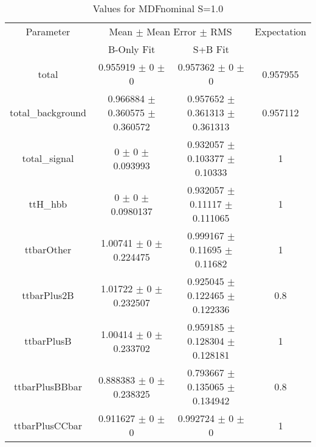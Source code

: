 \begin{table}
\centering
\caption{Values for MDFnominal S=1.0}
\begin{tabular}{cccc}
\toprule
Parameter & \multicolumn{2}{c}{Mean $\pm$ Mean Error $\pm$ RMS} & Expectation\\
 & B-Only Fit & S+B Fit & \\
\midrule
total & \num{0.955919} $\pm$ \num{0} $\pm$ \num{0} & \num{0.957362} $\pm$ \num{0} $\pm$ \num{0} & \num{0.957955}\\
total\_background & \num{0.966884} $\pm$ \num{0.360575} $\pm$ \num{0.360572} & \num{0.957652} $\pm$ \num{0.361313} $\pm$ \num{0.361313} & \num{0.957112}\\
total\_signal & \num{0} $\pm$ \num{0} $\pm$ \num{0.093993} & \num{0.932057} $\pm$ \num{0.103377} $\pm$ \num{0.10333} & \num{1}\\
ttH\_hbb & \num{0} $\pm$ \num{0} $\pm$ \num{0.0980137} & \num{0.932057} $\pm$ \num{0.11117} $\pm$ \num{0.111065} & \num{1}\\
ttbarOther & \num{1.00741} $\pm$ \num{0} $\pm$ \num{0.224475} & \num{0.999167} $\pm$ \num{0.11695} $\pm$ \num{0.11682} & \num{1}\\
ttbarPlus2B & \num{1.01722} $\pm$ \num{0} $\pm$ \num{0.232507} & \num{0.925045} $\pm$ \num{0.122465} $\pm$ \num{0.122336} & \num{0.8}\\
ttbarPlusB & \num{1.00414} $\pm$ \num{0} $\pm$ \num{0.233702} & \num{0.959185} $\pm$ \num{0.128304} $\pm$ \num{0.128181} & \num{1}\\
ttbarPlusBBbar & \num{0.888383} $\pm$ \num{0} $\pm$ \num{0.238325} & \num{0.793667} $\pm$ \num{0.135065} $\pm$ \num{0.134942} & \num{0.8}\\
ttbarPlusCCbar & \num{0.911627} $\pm$ \num{0} $\pm$ \num{0} & \num{0.992724} $\pm$ \num{0} $\pm$ \num{0} & \num{1}\\
\bottomrule
\end{tabular}
\end{table}